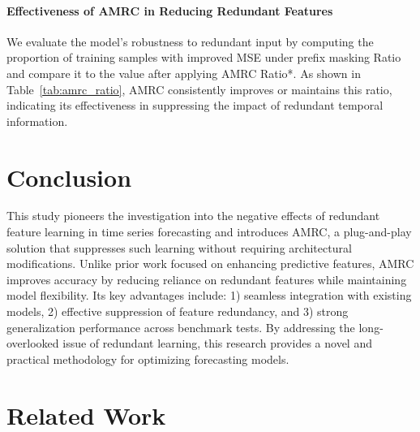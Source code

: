 \documentclass{article}
\begin{document}
\paragraph{Effectiveness of AMRC in Reducing Redundant Features} 
We evaluate the model’s robustness to redundant input by computing the proportion of training samples with improved MSE under prefix masking Ratio and compare it to the value after applying AMRC Ratio*. As shown in Table~\ref{tab:amrc_ratio}, AMRC consistently improves or maintains this ratio, indicating its effectiveness in suppressing the impact of redundant temporal information. 

\section{Conclusion}
This study pioneers the investigation into the negative effects of redundant feature learning in time series forecasting and introduces AMRC, a plug-and-play solution that suppresses such learning without requiring architectural modifications. Unlike prior work focused on enhancing predictive features, AMRC improves accuracy by reducing reliance on redundant features while maintaining model flexibility. Its key advantages include: 1) seamless integration with existing models, 2) effective suppression of feature redundancy, and 3) strong generalization performance across benchmark tests. By addressing the long-overlooked issue of redundant learning, this research provides a novel and practical methodology for optimizing forecasting models.


\medskip



\newpage
\appendix
\section{Related Work}
\end{document}
